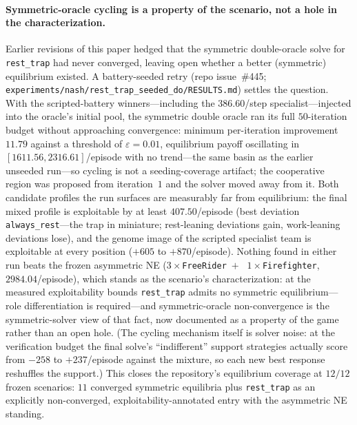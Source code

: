 \documentclass{anvil-paper}
\begin{document}
\paragraph{Symmetric-oracle cycling is a property of the scenario, not
a hole in the characterization.}
Earlier revisions of this paper hedged that the symmetric double-oracle
solve for \texttt{rest\_trap} had never converged, leaving open whether
a better (symmetric) equilibrium existed. A battery-seeded retry (repo
issue~\#445;
\texttt{experiments/nash/rest\_trap\_seeded\_do/RESULTS.md}) settles
the question. With the scripted-battery winners---including the
$386.60$/step specialist---injected into the oracle's initial pool, the
symmetric double oracle ran its full $50$-iteration budget without
approaching convergence: minimum per-iteration improvement $11.79$
against a threshold of $\varepsilon{=}0.01$, equilibrium payoff
oscillating in $[1611.56, 2316.61]$/episode with no trend---the same
basin as the earlier unseeded run---so cycling is not a
seeding-coverage artifact; the cooperative region was proposed from
iteration~$1$ and the solver moved away from it. Both candidate
profiles the run surfaces are measurably far from equilibrium: the final
mixed profile is exploitable by at least $407.50$/episode (best
deviation \texttt{always\_rest}---the trap in miniature; rest-leaning
deviations gain, work-leaning deviations lose), and the genome image of
the scripted specialist team is exploitable at every position ($+605$
to $+870$/episode). Nothing found in either run beats the frozen
asymmetric NE ($3{\times}$\texttt{FreeRider}~$+$~%
$1{\times}$\texttt{Firefighter}, $2984.04$/episode), which stands as
the scenario's characterization: at the measured exploitability bounds
\texttt{rest\_trap} admits no symmetric equilibrium---role
differentiation is required---and symmetric-oracle non-convergence is
the symmetric-solver view of that fact, now documented as a property of
the game rather than an open hole. (The cycling mechanism itself is
solver noise: at the verification budget the final solve's
``indifferent'' support strategies actually score from $-258$ to
$+237$/episode against the mixture, so each new best response reshuffles
the support.) This closes the repository's equilibrium coverage at
$12/12$ frozen scenarios: $11$ converged symmetric equilibria plus
\texttt{rest\_trap} as an explicitly non-converged,
exploitability-annotated entry with the asymmetric NE standing.
\end{document}
